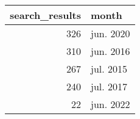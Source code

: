 \begin{tabular}{rl}
\toprule
 search\_results &     month \\
\midrule
            326 & jun. 2020 \\
            310 & jun. 2016 \\
            267 & jul. 2015 \\
            240 & jul. 2017 \\
             22 & jun. 2022 \\
\bottomrule
\end{tabular}
